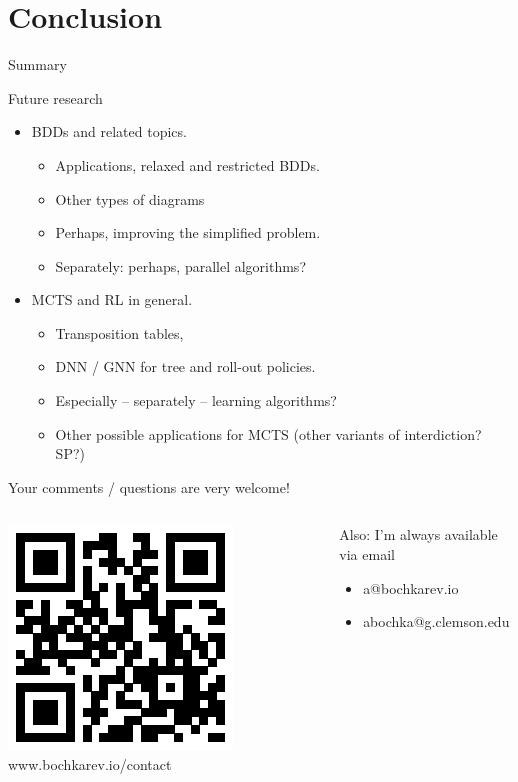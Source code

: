 \documentclass[10pt, xcolor=svgnames]{beamer}
\begin{document}
\section*{Conclusion}
\label{sec:orged6a4c8}
\begin{frame}[label={sec:org88fb9df}]{Summary}
\tableofcontents
\end{frame}
\begin{frame}[label={sec:org0ca662b}]{Future research}
\begin{itemize}
\item BDDs and related topics.
\begin{itemize}
\item Applications, \alert{relaxed} and \alert{restricted} BDDs.
\item Other types of diagrams
\item Perhaps, improving the simplified problem.
\item Separately: perhaps, parallel algorithms?
\end{itemize}
\item MCTS and RL in general.
\begin{itemize}
\item Transposition tables,
\item DNN / GNN for tree and roll-out policies.
\item Especially -- separately -- learning algorithms?
\item Other possible applications for MCTS (other variants of interdiction? SP?)
\end{itemize}
\end{itemize}
\end{frame}
\begin{frame}[label={sec:org5c26145}]{Your comments / questions are very welcome!}
\begin{columns}
\begin{column}{0.5\columnwidth}
\centering
\includegraphics{./img/website.eps}
www.bochkarev.io/contact
\end{column}
\begin{column}{0.5\columnwidth}
Also: I'm always available via email
\begin{itemize}
\item a@bochkarev.io
\item abochka@g.clemson.edu
\end{itemize}
\end{column}
\end{columns}
\end{frame}
\end{document}
